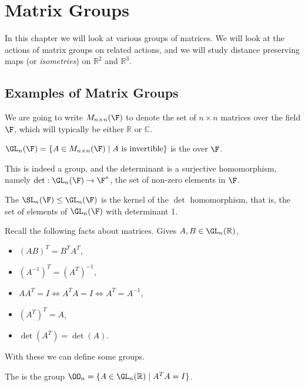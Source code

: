 \documentclass[a4paper]{scrartcl}
\begin{document}
\section{Matrix Groups}

In this chapter we will look at various groups of matrices. We will look at the actions of matrix groups on related actions, and we will study distance preserving maps (or \emph{isometries}) on $\mathbb{R}^2$ and $\mathbb{R}^3$.

\subsection{Examples of Matrix Groups}

We are going to write $M_{n \times n}(\F)$ to denote the set of $n \times n$ matrices over the field $\F$, which will typically be either $\mathbb{R}$ or $\mathbb{C}$.

\begin{definition}
	$\GL_n(\F) = \{A \in M_{n \times n}(\F) \mid A \text{ is invertible}\}$
 is the  over $\F$.
\end{definition}

This is indeed a group, and the determinant is a surjective homomorphism, namely $\det : \GL_n(\F) \rightarrow \F^*$, the set of non-zero elements in $\F$.

\begin{definition}
	The  $\SL_n(\F) \leq \GL_n(\F)$ is the kernel of the $\det$ homomorphism, that is, the set of elements of $\GL_n(\F)$ with determinant 1.
\end{definition}

Recall the following facts about matrices. Gives $A, B \in \GL_n(\mathbb{R})$,
\begin{itemize}
	\item $(AB)^T = B^T A^T$,
	\item $(A^{-1})^T = (A^T)^{-1}$,
	\item $AA^{T} = I \iff A^{T} A = I \iff A^T = A^{-1}$,
	\item $(A^T)^T = A$,
	\item $\det(A^T) = \det(A)$.
\end{itemize}
With these we can define some groups.

\begin{definition}
	The  is the group $\OO_n = \{A \in \GL_n(\mathbb{R}) \mid A^T A = I\}$.
\end{definition}
\end{document}
